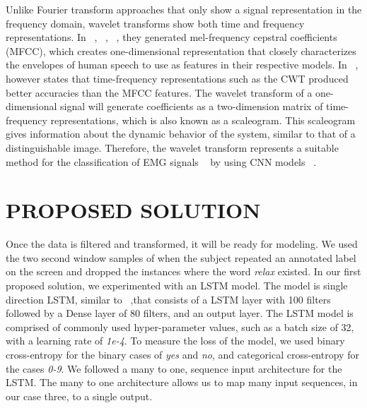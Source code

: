\documentclass{article}
\begin{document}
Unlike Fourier transform approaches that only show a signal representation in the frequency domain, wavelet transforms show both time and frequency representations. In ~\cite{janke_emg--speech:_2017}, ~\cite{kapur_alterego:_2018}, ~\cite{diener_session-independent_nodate}, they generated mel-frequency cepstral coefficients (MFCC), which creates one-dimensional representation that closely characterizes the envelopes of human speech to use as features in their respective models. In ~\cite{huzaifah_comparison_2017}, however states that time-frequency representations such as the CWT produced better accuracies than the MFCC features. The wavelet transform of a one-dimensional signal will generate coefficients as a two-dimension matrix of time-frequency representations, which is also known as a scaleogram. This scaleogram gives information about the dynamic behavior of the system, similar to that of a distinguishable image. Therefore, the wavelet transform represents a suitable method for the classification of EMG signals ~\cite{pauk_419._2008} by using CNN models ~\cite{huzaifah_comparison_2017}.

\section{PROPOSED SOLUTION}
\label{sec:PROPOSED SOLUTION}

Once the data is filtered and transformed, it will be ready for modeling. We used the two second window samples of when the subject repeated an annotated label on the screen and dropped the instances where the word \textit{relax} existed. In our first proposed solution, we experimented with an LSTM model. The model is single direction LSTM, similar to ~\cite{janke_emg--speech:_2017},that consists of a LSTM layer with 100 filters followed by a Dense layer of 80 filters, and an output layer. The LSTM model is comprised of commonly used hyper-parameter values, such as a batch size of 32, with a learning rate of \textit{1e-4}. To measure the loss of the model, we used binary cross-entropy for the binary cases of \textit{yes} and \textit{no}, and categorical cross-entropy for the cases \textit{0-9}. We followed a many to one, sequence input architecture for the LSTM. The many to one architecture allows us to map many input sequences, in our case three, to a single output.
\end{document}
